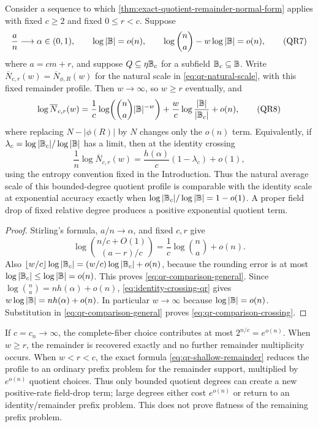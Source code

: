 \documentclass[11pt,a4paper]{amsart}
\numberwithin{equation}{section}
\theoremstyle{remark}
\begin{document}
\begin{proposition}
\label{prop:identity-quotient-comparison}
Consider a sequence to which
\cref{thm:exact-quotient-remainder-normal-form} applies with fixed
$c\ge2$ and fixed $0\le r<c$.  Suppose
\[
 \frac an\longrightarrow\alpha\in(0,1),\qquad
 \log|\mathbb B|=o(n),\qquad
 \log\binom na-w\log|\mathbb B|=o(n),                     \tag{QR7}\label{eq:identity-crossing-qr}
\]
where $a=cm+r$, and suppose
\(Q\subseteq\eta\mathbb B_c\) for a subfield $\mathbb B_c\subseteq\mathbb B$.
Write \(\overline N_{c,r}(w)=\overline N_{\phi,R}(w)\) for the natural
scale in \eqref{eq:qr-natural-scale}, with this fixed remainder profile.
Then $w\to\infty$, so $w\ge r$ eventually, and
\[
 \log\overline N_{c,r}(w)
 =\frac1c\log\!\left(\binom na|\mathbb B|^{-w}\right)
  +\frac wc\log\frac{|\mathbb B|}{|\mathbb B_c|}+o(n),           \tag{QR8}\label{eq:qr-comparison-general}
\]
where replacing $N-|\phi(R)|$ by $N$ changes only the $o(n)$ term.
Equivalently, if
\(\lambda_c=\log|\mathbb B_c|/\log|\mathbb B|\) has a limit, then at the identity
crossing
\[
       \frac1n\log\overline N_{c,r}(w)
       =\frac{h(\alpha)}c(1-\lambda_c)+o(1),         \tag{QR9}\label{eq:qr-comparison-crossing}
\]
using the entropy convention fixed in the Introduction.
Thus the natural average scale of this bounded-degree quotient profile is
comparable with the identity scale at exponential accuracy exactly when
\(\log|\mathbb B_c|/\log|\mathbb B|=1-o(1)\).  A proper field drop of fixed relative
degree produces a positive exponential quotient term.
\end{proposition}

\begin{proof}
Stirling's formula, $a/n\to\alpha$, and fixed $c,r$ give
\[
 \log\binom{n/c+O(1)}{(a-r)/c}
 =\frac1c\log\binom na+o(n).
\]
Also
\(\lfloor w/c\rfloor\log|\mathbb B_c|
=(w/c)\log|\mathbb B_c|+o(n)\), because the rounding error is at most
\(\log|\mathbb B_c|\le\log|\mathbb B|=o(n)\).  This proves
\eqref{eq:qr-comparison-general}.  Since
\(\log\binom na=nh(\alpha)+o(n)\),
\eqref{eq:identity-crossing-qr} gives
\(w\log|\mathbb B|=nh(\alpha)+o(n)\).  In particular $w\to\infty$ because
\(\log|\mathbb B|=o(n)\).  Substitution in
\eqref{eq:qr-comparison-general} proves
\eqref{eq:qr-comparison-crossing}.
\end{proof}

\begin{remark}
If $c=c_n\to\infty$, the complete-fiber choice contributes at most
\(2^{n/c}=e^{o(n)}\).  When $w\ge r$, the remainder is recovered exactly
and no further remainder multiplicity occurs.  When $w<r<c$, the exact
formula \eqref{eq:qr-shallow-remainder} reduces the profile to an ordinary
prefix problem for the remainder support, multiplied by $e^{o(n)}$
quotient choices.  Thus only bounded quotient degrees can create a new
positive-rate field-drop term; large degrees either cost $e^{o(n)}$ or
return to an identity/remainder prefix problem.  This does not prove
flatness of the remaining prefix problem.
\end{remark}
\end{document}
